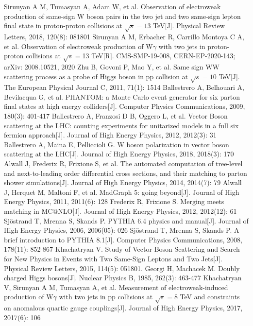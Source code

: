 \documentclass{SCIS2020cn}
\begin{document}
\begin{thebibliography}{99}
 Sirunyan A M, Tumasyan A, Adam W, et al. Observation of electroweak production of same-sign W boson pairs in the two jet and two same-sign lepton final state in proton-proton collisions at $\sqrt{s} = 13$ TeV[J]. Physical Review Letters, 2018, 120(8): 081801
 Sirunyan A M, Erbacher R, Carrillo Montoya C A, et al. Observation of electroweak production of W$\gamma $ with two jets in proton-proton collisions at $\sqrt {s}= $13 TeV[R]. CMS-SMP-19-008, CERN-EP-2020-143; arXiv: 2008.10521, 2020
 Zhu B, Govoni P, Mao Y, et al. Same sign WW scattering process as a probe of Higgs boson in pp collision at $\sqrt {s}= 10$ TeV[J]. The European Physical Journal C, 2011, 71(1): 1514
 Ballestrero A, Belhouari A, Bevilacqua G, et al. PHANTOM: a Monte Carlo event generator for six parton final states at high energy colliders[J]. Computer Physics Communications, 2009, 180(3): 401-417
 Ballestrero A, Franzosi D B, Oggero L, et al. Vector Boson scattering at the LHC: counting experiments for unitarized models in a full six fermion approach[J]. Journal of High Energy Physics, 2012, 2012(3): 31
 Ballestrero A, Maina E, Pelliccioli G. W boson polarization in vector boson scattering at the LHC[J]. Journal of High Energy Physics, 2018, 2018(3): 170
 Alwall J, Frederix R, Frixione S, et al. The automated computation of tree-level and next-to-leading order differential cross sections, and their matching to parton shower simulations[J]. Journal of High Energy Physics, 2014, 2014(7): 79
 Alwall J, Herquet M, Maltoni F, et al. MadGraph 5: going beyond[J]. Journal of High Energy Physics, 2011, 2011(6): 128
 Frederix R, Frixione S. Merging meets matching in MC@NLO[J]. Journal of High Energy Physics, 2012, 2012(12): 61
 Sjöstrand T, Mrenna S, Skands P. PYTHIA 6.4 physics and manual[J]. Journal of High Energy Physics, 2006, 2006(05): 026
 Sjöstrand T, Mrenna S, Skands P. A brief introduction to PYTHIA 8.1[J]. Computer Physics Communications, 2008, 178(11): 852-867
 Khachatryan V. Study of Vector Boson Scattering and Search for New Physics in Events with Two Same-Sign Leptons and Two Jets[J]. Physical Review Letters, 2015, 114(5): 051801.
 Georgi H, Machacek M. Doubly charged Higgs bosons[J]. Nuclear Physics B, 1985, 262(3): 463-477
 Khachatryan V, Sirunyan A M, Tumasyan A, et al. Measurement of electroweak-induced production of W$\gamma$ with two jets in pp collisions at $\sqrt {s}= 8$ TeV and constraints on anomalous quartic gauge couplings[J]. Journal of High Energy Physics, 2017, 2017(6): 106

\end{thebibliography}
\end{document}
